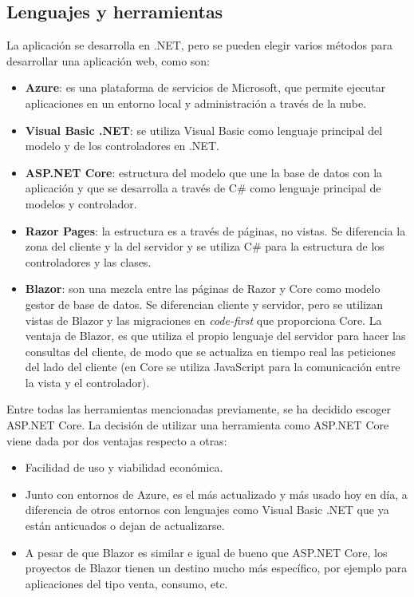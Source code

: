 \subsection{Lenguajes y herramientas}
La aplicación se desarrolla en .NET, pero se pueden elegir varios métodos para desarrollar una aplicación web, como son:
\begin{itemize}
 \item \textbf{Azure}: es una plataforma de servicios de Microsoft, que permite ejecutar aplicaciones en un entorno local y administración a través de la nube.
 \item \textbf{Visual Basic .NET}: se utiliza Visual Basic como lenguaje principal del modelo y de los controladores en .NET.
 \item \textbf{ASP.NET Core}: estructura del modelo que une la base de datos con la aplicación y que se desarrolla a través de C\# como lenguaje principal de modelos y controlador.
 \item \textbf{Razor Pages}: la estructura es a través de páginas, no vistas. Se diferencia la zona del cliente y la del servidor y se utiliza C\# para la estructura de los controladores y las clases.
 \item \textbf{Blazor}: son una mezcla entre las páginas de Razor y Core como modelo gestor de base de datos. Se diferencian cliente y servidor, pero se utilizan vistas de Blazor y las migraciones en \emph{code-first} que proporciona Core. La ventaja de Blazor, es que utiliza el propio lenguaje del servidor para hacer las consultas del cliente, de modo que se actualiza en tiempo real las peticiones del lado del cliente (en Core se utiliza JavaScript para la comunicación entre la vista y el controlador).
\end{itemize}

Entre todas las herramientas mencionadas previamente, se ha decidido escoger ASP.NET Core. La decisión de utilizar una herramienta como ASP.NET Core viene dada por dos ventajas respecto a otras:
\begin{itemize}
 \item Facilidad de uso y viabilidad económica.
 \item Junto con entornos de Azure, es el más actualizado y más usado hoy en día, a diferencia de otros entornos con lenguajes como Visual Basic .NET que ya están anticuados o dejan de actualizarse.
 \item A pesar de que Blazor es similar e igual de bueno que ASP.NET Core, los proyectos de Blazor tienen un destino mucho más específico, por ejemplo para aplicaciones del tipo venta, consumo, etc.
\end{itemize}


